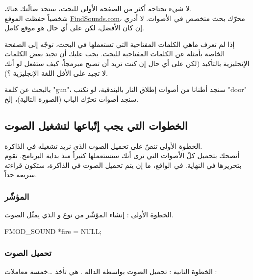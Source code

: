 لا شيء تحتاجه أكثر من الصفحة الأولى للبحث، ستجد ضالّتك هناك.\\
شخصياً حفظت الموقع 
\href{http://www.findsounds.com/}{\textenglish{FindSounds.com}}،
محرّك بحث متخصص في الأصوات. لا أدري إن كان الأفضل، لكن على أي حال هو موقع كامل.

\begin{information}
إذا لم تعرف  ماهي الكلمات المفتاحية التي تستعملها في البحث، توجّه إلى الصفحة الخاصة بأمثلة عن الكلمات المفتاحية للبحث.
يجب عليك أن تجيد بعض الكلمات الإنجليزية بالتأكيد (لكن على أي حال إن كنت تريد أن تصبح مبرمجاً، كيف ستفعل لو أنك لا تجيد على الأقل اللغة الإنجليزية ؟).
\end{information}

بالبحث عن كلمة
"\textenglish{gun}"،
سنجد أطنانا من أصوات إطلاق النار بالبندقية، لو نكتب
"\textenglish{door}"
سنجد أصوات تحرّك الباب (الصورة التالية)، إلخ.


\subsection{الخطوات التي يجب إتّباعها لتشغيل الصوت}

 الخطوة الأولى تنصّ على تحميل الصوت الذي نريد تشغيله في الذاكرة.\\
أنصحك بتحميل كلّ الأصوات التي ترى أنك ستستعملها كثيراً منذ بداية البرنامج. تقوم بتحريرها في النهاية. في الواقع، ما إن يتم تحميل الصوت في الذاكرة، ستكون قراءته سريعة جداً.

\subsubsection{المؤشّر}

الخطوة الأولى : إنشاء المؤشّر من نوع
و الذي يمثّل الصوت.

\begin{Csource}
FMOD_SOUND *fire = NULL;
\end{Csource}

\subsubsection{تحميل الصوت}

الخطوة الثانية : تحميل الصوت بواسطة الدالة
.
هي تأخذ \dots خمسة معاملات :

